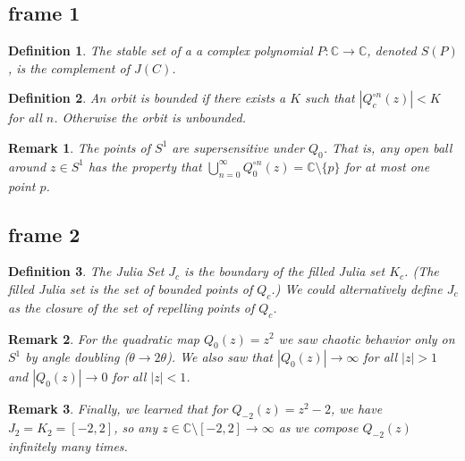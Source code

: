 \documentclass[xcolor=x11names,compress]{beamer}
\renewcommand{\(}{\begin{columns}}
\renewcommand{\)}{\end{columns}}
\newcommand{\<}[1]{\begin{column}{#1}}
\renewcommand{\>}{\end{column}}
\newtheorem{defn}{Definition}
\newtheorem{rmk}{Remark}
\begin{document}
\subsection{frame 1}
\begin{frame}


\pause

\begin{defn}
The \textsl{stable set} of a a complex polynomial $P: \mathbb{C} \rightarrow \mathbb{C}$, denoted $S(P)$, is the complement of $J(C)$.
\end{defn}

\pause

\begin{defn}
An orbit is \textsl{bounded} if there exists a $K$ such that $|Q_c^{\circ n}(z)| < K$ for all $n$. Otherwise the orbit is \textsl{unbounded}.
\end{defn}

\pause

\begin{rmk}
The points of $S^1$ are \textsl{supersensitive} under $Q_{0}$. That is, any open ball around $z \in S^1$ has the property that $\bigcup_{n=0}^\infty Q_0^{\circ n} (z) = \mathbb{C} \setminus \{p\}$ for at most one point $p$.
\end{rmk}

\end{frame}

\subsection{frame 2}
\begin{frame}

\begin{defn}
The Julia Set $J_c$ is the boundary of the filled Julia set $K_c$. (The filled Julia set is the set of bounded points of $Q_c$.) We could alternatively define $J_c$ as the closure of the set of repelling points of $Q_c$.
\end{defn}

\pause


\begin{rmk}
For the quadratic map $Q_0(z) = z^2$ we saw chaotic behavior only on $S^1$ by angle doubling ($\theta \rightarrow 2\theta$). We also saw that $|Q_0(z)| \rightarrow \infty$ for all $|z| > 1$ and $|Q_0(z)| \rightarrow 0$ for all $|z| < 1$.
\end{rmk}

\pause


\begin{rmk}
Finally, we learned that for $Q_{-2}(z) = z^2 - 2$, we have $J_2 = K_2 = [-2, 2]$, so any $z \in \mathbb{C} \setminus [-2,2] \rightarrow \infty$ as we compose $Q_{-2}(z)$ infinitely many times. 
\end{rmk}

\end{frame}
\end{document}
